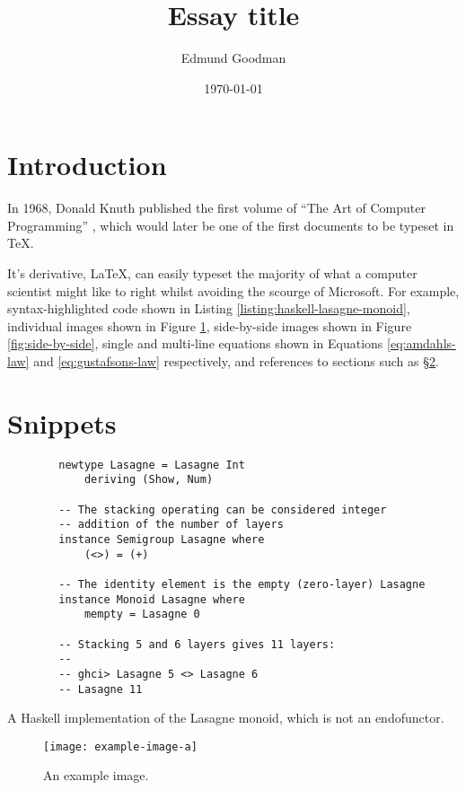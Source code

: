 \documentclass[12pt]{article}
\title{Essay title}
\author{Edmund Goodman}
\date{\today}
\begin{document}
\maketitle

\section{Introduction}
\label{sec:introduction}

In 1968, Donald Knuth published the first volume of ``The Art of Computer Programming'' \cite{knuth1997art}, which would later be one of the first documents to be typeset in \TeX.

It's derivative, \LaTeX, can easily typeset the majority of what a computer scientist might like to right whilst avoiding the scourge of Microsoft. For example, syntax-highlighted code shown in Listing \ref{listing:haskell-lasagne-monoid}, individual images shown in Figure \ref{fig:example-image-a}, side-by-side images shown in Figure \ref{fig:side-by-side}, single and multi-line equations shown in Equations \ref{eq:amdahls-law} and \ref{eq:gustafsons-law} respectively, and references to sections such as §\ref{sec:snippets}.

\section{Snippets}
\label{sec:snippets}

\begin{listing}[H]
    \begin{verbatim}
        newtype Lasagne = Lasagne Int
            deriving (Show, Num)

        -- The stacking operating can be considered integer
        -- addition of the number of layers
        instance Semigroup Lasagne where
            (<>) = (+)

        -- The identity element is the empty (zero-layer) Lasagne
        instance Monoid Lasagne where
            mempty = Lasagne 0

        -- Stacking 5 and 6 layers gives 11 layers:
        --
        -- ghci> Lasagne 5 <> Lasagne 6
        -- Lasagne 11
    \end{verbatim}
    \caption{A Haskell implementation of the Lasagne monoid, which is not an endofunctor.}
    \label{listing:haskell-lasagne-monoid}
\end{listing}

\begin{figure}[H]
    \centering
    \texttt{[image: example-image-a]}
    \caption{An example image.}
    \label{fig:example-image-a}
\end{figure}
\end{document}
